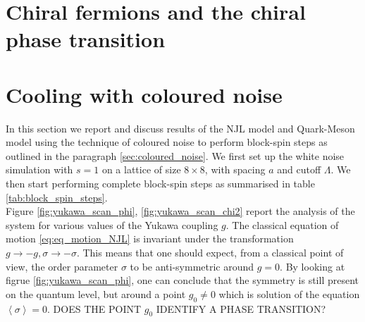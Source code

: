 \section{Chiral fermions and the chiral phase transition}

\section{Cooling with coloured noise}
In this section we report and discuss results of the NJL model and Quark-Meson model using the technique of coloured noise to perform block-spin steps as outlined in the paragraph \ref{sec:coloured_noise}. We first set up the white noise simulation with $s=1$ on a lattice of size $8 \times 8$, with spacing $a$ and cutoff $\Lambda$. We then start performing complete block-spin steps as summarised in table \ref{tab:block_spin_steps}. \\

Figure \ref{fig:yukawa_scan_phi}, \ref{fig:yukawa_scan_chi2} report the analysis of the system for various values of the Yukawa coupling $g$. The classical equation of motion \eqref{eq:eq_motion_NJL} is invariant under the transformation $g \to -g, \sigma \to -\sigma$. This means that one should expect, from a classical point of view, the order parameter $\sigma$ to be anti-symmetric around $g = 0$. By looking at figrue \ref{fig:yukawa_scan_phi}, one can conclude that the symmetry is still present on the quantum level, but around a point $g_0 \neq 0$ which is solution of the equation $\left\langle \sigma \right\rangle = 0$. DOES THE POINT $g_0$ IDENTIFY A PHASE TRANSITION?

